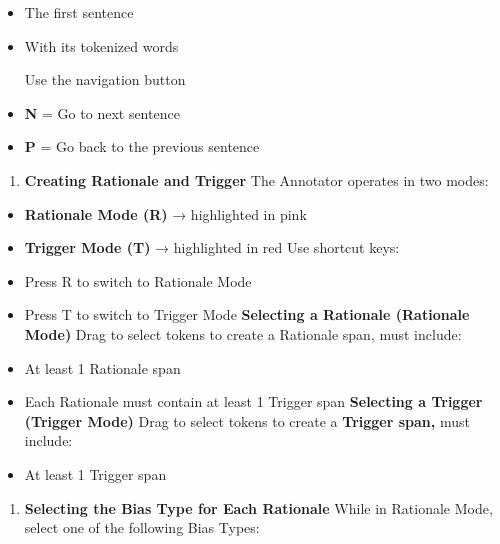 \documentclass[12pt,oneside,openright,a4paper]{cpe-english-project}
\begin{document}
\begin{itemize}
\setlength{\itemsep}{0.15\baselineskip}
\setlength{\parsep}{0pt}
\setlength{\parskip}{0pt}
\item
  The first sentence
\item
  With its tokenized words

  Use the navigation button
\item
  \textbf{N} = Go to next sentence
\item
  \textbf{P} = Go back to the previous sentence
\end{itemize}

\begin{enumerate}
\setlength{\itemsep}{0.15\baselineskip}
\setlength{\parsep}{0pt}
\setlength{\parskip}{0pt}
\def\labelenumi{\arabic{enumi})}
\setcounter{enumi}{1}
\item
  \textbf{Creating Rationale and Trigger}
  The Annotator operates in two modes:
\end{enumerate}

\begin{itemize}
\setlength{\itemsep}{0.15\baselineskip}
\setlength{\parsep}{0pt}
\setlength{\parskip}{0pt}
\item
  \textbf{Rationale Mode (R)} → highlighted in pink
\item
  \textbf{Trigger Mode (T)} → highlighted in red
  Use shortcut keys:
\item
  Press R to switch to Rationale Mode
\item
  Press T to switch to Trigger Mode
  \textbf{Selecting a Rationale (Rationale Mode)}
  Drag to select tokens to create a Rationale span, must include:
\item
  At least 1 Rationale span
\item
  Each Rationale must contain at least 1 Trigger span
  \textbf{Selecting a Trigger (Trigger Mode)}
  Drag to select tokens to create a \textbf{Trigger span,} must include:
\item
  At least 1 Trigger span
\end{itemize}

\begin{enumerate}
\setlength{\itemsep}{0.15\baselineskip}
\setlength{\parsep}{0pt}
\setlength{\parskip}{0pt}
\def\labelenumi{\arabic{enumi})}
\setcounter{enumi}{2}
\item
  \textbf{Selecting the Bias Type for Each Rationale}
  While in Rationale Mode, select one of the following Bias Types:
\end{enumerate}
\end{document}
